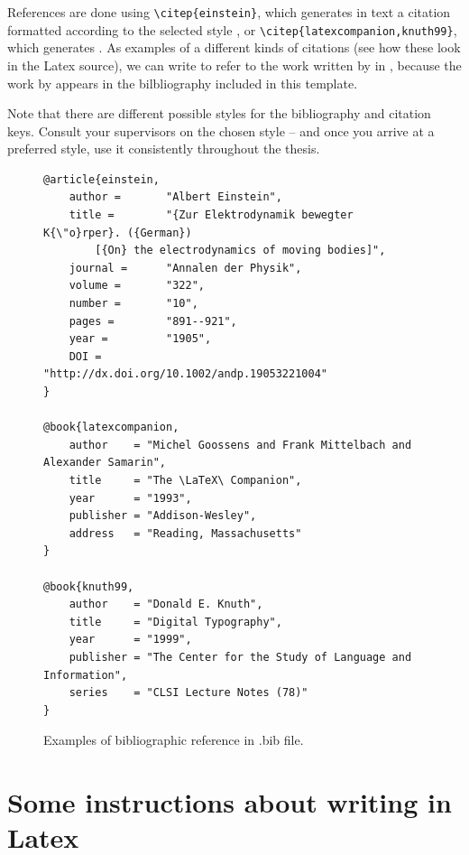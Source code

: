 References are done using \texttt{\textbackslash citep\{einstein\}}, which generates in text a citation formatted according to the selected style \citep{einstein}, or \texttt{\textbackslash citep\{latexcompanion,knuth99\}}, which generates \citep{latexcompanion,knuth99}. 
As examples of a different kinds of citations (see how these look in the Latex source), we can write \citep{einstein} to refer to the work written by \citeauthor{einstein} in \citeyear{einstein}, because the work by \citet{einstein} appears in the bilbliography included in this template.

Note that there are different possible styles for the bibliography and citation keys.
%
Consult your supervisors on the chosen style -- and once you arrive at a preferred style, use it consistently throughout the thesis.

\begin{figure}[ht]
    \centering
    \begin{scriptsize}
\begin{verbatim}
@article{einstein,
    author =       "Albert Einstein",
    title =        "{Zur Elektrodynamik bewegter K{\"o}rper}. ({German})
        [{On} the electrodynamics of moving bodies]",
    journal =      "Annalen der Physik",
    volume =       "322",
    number =       "10",
    pages =        "891--921",
    year =         "1905",
    DOI =          "http://dx.doi.org/10.1002/andp.19053221004"
}
 
@book{latexcompanion,
    author    = "Michel Goossens and Frank Mittelbach and Alexander Samarin",
    title     = "The \LaTeX\ Companion",
    year      = "1993",
    publisher = "Addison-Wesley",
    address   = "Reading, Massachusetts"
}

@book{knuth99,
    author    = "Donald E. Knuth",
    title     = "Digital Typography",
    year      = "1999",
    publisher = "The Center for the Study of Language and Information",
    series    = "CLSI Lecture Notes (78)"
}\end{verbatim}
\end{scriptsize}
    \caption{Examples of bibliographic reference in .bib file.}
    \label{bibexamples}
\end{figure}


\section{Some instructions about writing in Latex}

